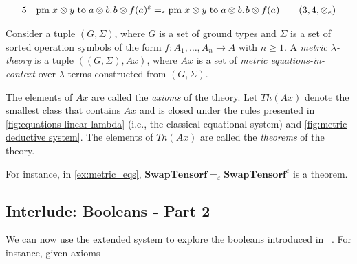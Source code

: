 \begin{example}
\begin{equation*}
\begin{split}
  5\hspace{10 pt}& \text{pm} \hspace{3 pt} x \otimes y\hspace{3 pt} \text{to} \hspace{3 pt} a \otimes b. \hspace{1pt} b \otimes f(a)^{\varepsilon} =_{\varepsilon} \text{pm} \hspace{3 pt} x \otimes y\hspace{3 pt} \text{to} \hspace{3 pt} a \otimes b. \hspace{1pt} b \otimes f(a) & \hspace{10pt} \text{($3,4,\otimes_e$)}
  \end{split}
  \end{equation*}
\end{example}


\begin{definition} \label{def:metric_lambda_theory}
  Consider a tuple \( (G, \Sigma) \), where \( G \) is a set of ground types and \( \Sigma \) is a set of sorted operation symbols of the form \( f : A_1, \ldots, A_n \to A \) with \( n \geq 1 \). A \emph{metric $\lambda$-theory} is a tuple \( ((G, \Sigma), Ax) \), where \( Ax \) is a set of \emph{metric equations-in-context} over  $\lambda$-terms constructed from \( (G, \Sigma) \).
\end{definition}

The elements of \( Ax \) are called the \emph{axioms} of the theory. Let \( Th(Ax) \) denote the smallest class that contains \( Ax \) and is closed under the rules presented in \autoref{fig:equations-linear-lambda} (i.e., the classical equational system) and \autoref{fig:metric deductive system}. The elements of \( Th(Ax) \) are called the \emph{theorems} of the theory.

For instance, in \autoref{ex:metric_eqs}, $\textbf{SwapTensorf} =_{\varepsilon} \textbf{SwapTensorf}^\varepsilon$ is a theorem.




\subsection{Interlude: Booleans - Part 2}



We can now use the extended system to explore the booleans introduced in  . For instance, given axioms

